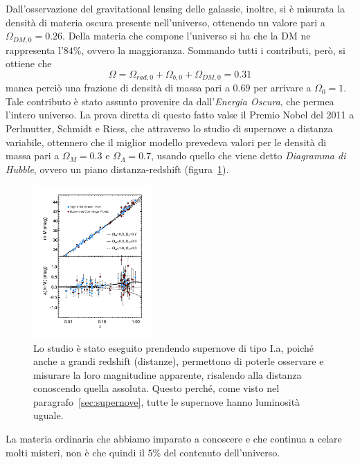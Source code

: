 Dall'osservazione del gravitational lensing delle galassie, inoltre, si è misurata la densità di materia oscura presente nell'universo, ottenendo un valore pari a $\Omega_{DM,0} = 0.26$. Della materia che compone l'universo si ha che la DM ne rappresenta l'$84\%$, ovvero la maggioranza. Sommando tutti i contributi, però, si ottiene che
\[
    \Omega = \Omega_{rad,0} + \Omega_{b,0} + \Omega_{DM,0} = 0.31
\]
manca perciò una frazione di densità di massa pari a $0.69$ per arrivare a $\Omega_0 = 1$. Tale contributo è stato assunto provenire da dall'\textit{Energia Oscura}, che permea l'intero universo. La prova diretta di questo fatto valse il Premio Nobel del 2011 a Perlmutter, Schmidt e Riess, che attraverso lo studio di supernove a distanza variabile, ottennero che il miglior modello prevedeva valori per le densità di massa pari a $\Omega_M = 0.3$ e $\Omega_\Lambda = 0.7$, usando quello che viene detto \textit{Diagramma di Hubble}, ovvero un piano distanza-redshift (figura~\ref{fig:diagramma-hubble}).
\begin{figure}
    \centering
    \includegraphics[width=0.4\textwidth]{immagini/hubble_diagram.png}
    \caption{Lo studio è stato eseguito prendendo supernove di tipo I.a, poiché anche a grandi redshift (distanze), permettono di poterle osservare e misurare la loro magnitudine apparente, risalendo alla distanza conoscendo quella assoluta. Questo perché, come visto nel paragrafo~\ref{sec:supernove}, tutte le supernove hanno luminosità uguale.}\label{fig:diagramma-hubble}
\end{figure}

La materia ordinaria che abbiamo imparato a conoscere e che continua a celare molti misteri, non è che quindi il $5\%$ del contenuto dell'universo. 